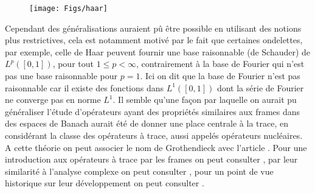 \begin{figure}
	\centering
	\texttt{[image: Figs/haar]}
	\label{fig:haar}	
\end{figure}
	
	Cependant des généralisations auraient pû être possible en utilisant des notions plus restrictives, cela est notamment motivé par le fait que certaines ondelettes, par exemple, celle de Haar peuvent fournir une base raisonnable (de Schauder) de $L^p([0,1])$, pour tout $1 \leq p < \infty$, contrairement à la base de Fourier qui n'est pas une base raisonnable pour $p=1$.
	Ici on dit que la base de Fourier n'est pas raisonnable car il existe des fonctions dans $L^1([0,1])$ dont la série de Fourier ne converge pas en norme $L^1$.
	\newline
	Il semble qu'une façon par laquelle on aurait pu généraliser l'étude d'opérateurs ayant des propriétés similaires aux frames dans des espaces de Banach aurait été de donner une place centrale à la trace, en considérant la classe des opérateurs à trace, aussi appelés opérateurs nucléaires.
	A cette théorie on peut associer le nom de Grothendieck avec l'article \cite{groth}. 
	Pour une introduction aux opérateurs à trace par les frames on peut consulter \cite{traceclass}, par leur similarité à l'analyse complexe on peut consulter \cite{acQuef}, pour un point de vue historique sur leur développement on peut consulter \cite{surlestraces}. 
